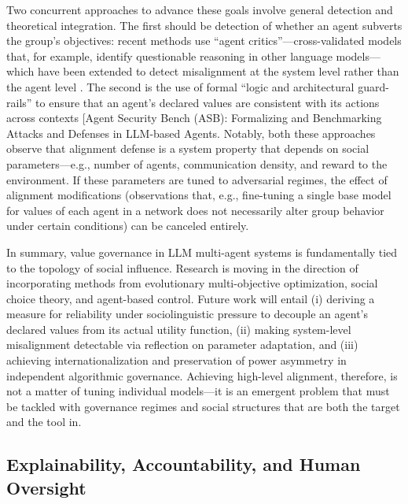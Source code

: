 \documentclass[11pt,a4paper]{article}
\begin{document}
Two concurrent approaches to advance these goals involve general detection and theoretical integration. The first should be detection of whether an agent subverts the group's objectives: recent methods use ``agent critics''---cross-validated models that, for example, identify questionable reasoning in other language models---which have been extended to detect misalignment at the system level rather than the agent level \cite{arxiv:2502.14847v2,arxiv:2511.09710v3}. The second is the use of formal ``logic and architectural guard-rails'' to ensure that an agent's declared values are consistent with its actions across contexts [Agent Security Bench (ASB): Formalizing and Benchmarking Attacks and Defenses in LLM-based Agents. Notably, both these approaches observe that alignment defense is a system property that depends on social parameters---e.g., number of agents, communication density, and reward to the environment. If these parameters are tuned to adversarial regimes, the effect of alignment modifications (observations that, e.g., fine-tuning a single base model for values of each agent in a network does not necessarily alter group behavior under certain conditions) can be canceled entirely.

In summary, value governance in LLM multi-agent systems is fundamentally tied to the topology of social influence. Research is moving in the direction of incorporating methods from evolutionary multi-objective optimization, social choice theory, and agent-based control. Future work will entail (i) deriving a measure for reliability under sociolinguistic pressure to decouple an agent's declared values from its actual utility function, (ii) making system-level misalignment detectable via reflection on parameter adaptation, and (iii) achieving internationalization and preservation of power asymmetry in independent algorithmic governance. Achieving high-level alignment, therefore, is not a matter of tuning individual models---it is an emergent problem that must be tackled with governance regimes and social structures that are both the target and the tool in.


\subsection{Explainability, Accountability, and Human Oversight}
\end{document}
